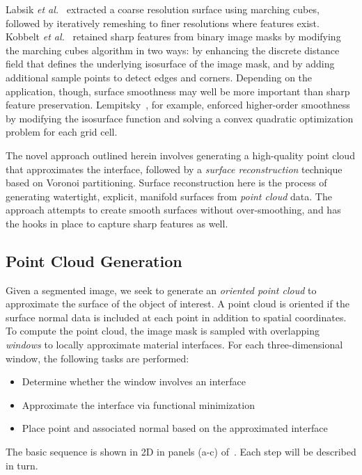 Labsik \textit{et al.}~\cite{labsik_2002} extracted a coarse resolution surface using marching cubes, followed by iteratively remeshing to finer resolutions where features exist. Kobbelt \textit{et al.}~\cite{kobbelt_2001} retained sharp features from binary image masks by modifying the marching cubes algorithm in two ways: by enhancing the discrete distance field that defines the underlying isosurface of the image mask, and by adding additional sample points to detect edges and corners. Depending on the application, though, surface smoothness may well be more important than sharp feature preservation. Lempitsky~\cite{lempitsky_2010}, for example, enforced higher-order smoothness by modifying the isosurface function and solving a convex quadratic optimization problem for each grid cell.

The novel approach outlined herein involves generating a high-quality point cloud that approximates the interface, followed by a  \textit{surface reconstruction} technique based on Voronoi partitioning. Surface reconstruction here is the process of generating watertight, explicit, manifold surfaces from \textit{point cloud} data. The approach attempts to create smooth surfaces without over-smoothing, and has the hooks in place to capture sharp features as well.

\subsection{Point Cloud Generation}
\label{Point Cloud Generation}

Given a segmented image, we seek to generate an \textit{oriented point cloud} to approximate the surface of the object of interest. A point cloud is oriented if the surface normal data is included at each point in addition to spatial coordinates. To compute the point cloud, the image mask is sampled with overlapping \textit{windows} to locally approximate material interfaces. For each three-dimensional window, the following tasks are performed:
\begin{itemize}[noitemsep]
  \item Determine whether the window involves an interface
  \item Approximate the interface via functional minimization
  \item Place point and associated normal based on the approximated interface
\end{itemize}
The basic sequence is shown in 2D in panels (a-c) of~. Each step will be described in turn.

